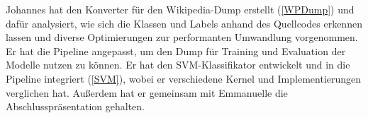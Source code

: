 Johannes hat den Konverter für den Wikipedia-Dump erstellt (\ref{WPDump}) und dafür analysiert, wie sich die Klassen und Labels anhand des Quellcodes erkennen lassen und diverse Optimierungen zur performanten Umwandlung vorgenommen. Er hat die Pipeline angepasst, um den Dump für Training und Evaluation der Modelle nutzen zu können. Er hat den SVM-Klassifikator entwickelt und in die Pipeline integriert (\ref{SVM}), wobei er verschiedene Kernel und Implementierungen verglichen hat. Außerdem hat er gemeinsam mit Emmanuelle die Abschlusspräsentation gehalten.